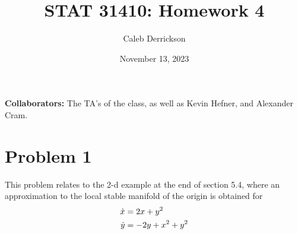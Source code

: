 

\title{STAT 31410: Homework 4}
\author{Caleb Derrickson}
\date{November 13, 2023}


\onehalfspacing
\maketitle
\allowdisplaybreaks
{\color{cit}\vspace{2mm}\noindent\textbf{Collaborators:}} The TA's of the class, as well as Kevin Hefner, and Alexander Cram.

\tableofcontents

\newpage
\section{Problem 1}
This problem relates to the 2-d example at the end of section 5.4, where an approximation to the local stable manifold of the origin is obtained for
\begin{align*}
    \dot{x} &= 2x + y^2\\
    \dot{y} &= -2y + x^2 + y^2
\end{align*}
